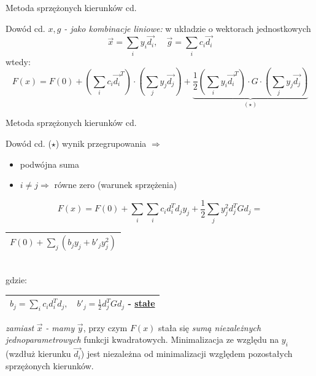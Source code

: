   \begin{frame}{Metoda sprzężonych kierunków cd.}

 	\begin{block}{Dowód cd.}
		\emph{$x, g$ -  jako kombinacje liniowe:} w układzie o wektorach jednostkowych
		\begin{displaymath}
			\vec{x} = \sum_i y_i \vec{d_i}, \quad \vec{g} = \sum_i c_i \vec{d_i}
		\end{displaymath}
		wtedy:
		\begin{displaymath}
			F(x) = F(0) + (\sum_i c_i \vec{d_i}^T) \cdot (\sum_j y_j \vec{d_j}) +
			\underbrace{\frac{1}{2} (\sum_i y_i \vec{d_i}^T) \cdot G \cdot (\sum_j y_j \vec{d_j})}_{(\star)}
		\end{displaymath}
 	\end{block}

  \end{frame}

  \begin{frame}{Metoda sprzężonych kierunków cd.}

 	\begin{block}{Dowód cd.}
 		($\star$) wynik przegrupowania $\Rightarrow$
		\begin{itemize}
			\item podwójna suma
			\item $i \neq j \Rightarrow$ równe zero (warunek sprzężenia)
		\end{itemize}
		\begin{displaymath}
			F(x) = F(0) + \sum_i \sum_i c_i d_i^T d_j y_j + \frac{1}{2} \sum_j y_j^2 d_j^T G d_j =
		\end{displaymath}
		\begin{center}
		   	\begin{tabular}{|c|}
		   	\hline
				$F(0) + \sum_j (b_j y_j + b'_j y_j^2)$
			\\ \hline
			\end{tabular}
			\smallskip
			\\gdzie:
			\begin{tabular}{|c|}
		   	\hline
				$b_j = \sum_i c_i d_i^T d_j{,} \quad b'_j = \frac{1}{2} d_j^T G d_j$ - \underline{stałe}
			\\ \hline
			\end{tabular}
		\end{center}
		\emph{zamiast} $\vec{x}$ \emph{- mamy} $\vec{y}$, przy czym $F(x)$ stała się \emph{sumą niezależnych jednoparametrowych} funkcji kwadratowych. Minimalizacja ze względu na $y_i$ (wzdłuż kierunku $\vec{d_i}$) jest niezależna od minimalizacji  względem pozostałych sprzężonych kierunków.
 	\end{block}

  \end{frame}

